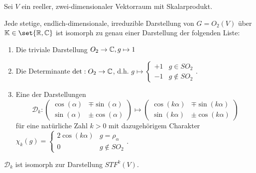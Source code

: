 \begin{theorem}
Sei $V$ ein reeller, zwei-dimensionaler Vektorraum mit Skalarprodukt.

Jede stetige, endlich-dimensionale, irreduzible Darstellung von $G=O_2(V)$ über $\IK\in\set{\IR,\IC}$ ist isomorph zu genau einer Darstellung der folgenden Liste:
\begin{enumerate}
\item Die triviale Darstellung $O_2\to\mathbb{C}, g\mapsto 1$
\item Die Determinante $\det: O_2\to\mathbb{C}$, d.h. $g\mapsto\begin{cases}+1&g\in SO_2 \\ -1&g\notin SO_2\end{cases}$.
\item Eine der Darstellungen
\[\mathcal{D}_k : \begin{pmatrix}\cos(\alpha)&\mp\sin(\alpha)\\\sin(\alpha)&\pm\cos(\alpha)\end{pmatrix} \mapsto \begin{pmatrix}\cos(k\alpha)&\mp\sin(k\alpha)\\\sin(k\alpha)&\pm\cos(k\alpha)\end{pmatrix}\]
für eine natürliche Zahl $k>0$ mit dazugehörigem Charakter $\chi_k(g) = \begin{cases} 2\cos(k\alpha) & g=\rho_\alpha \\ 0 & g\notin SO_2\end{cases}$.
\end{enumerate}
$\mathcal{D}_k$ ist isomorph zur Darstellung $STF^k(V)$.
\end{theorem}
